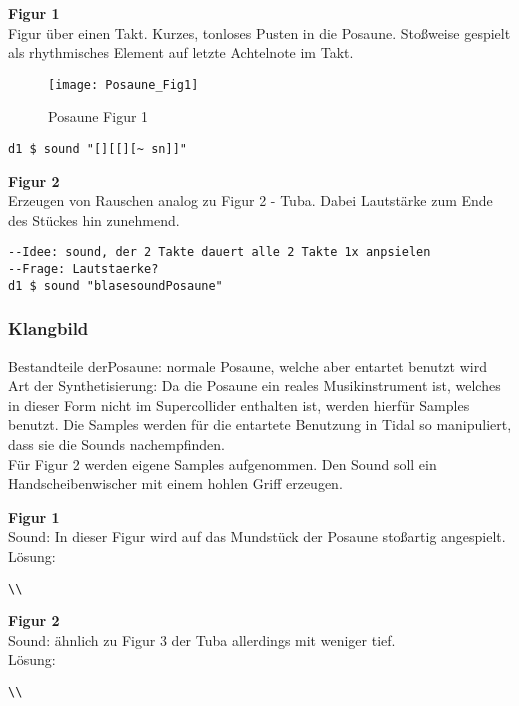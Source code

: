 \documentclass[
10pt, %
a4paper, %
oneside, %
headinclude,footinclude, %
BCOR5mm, %
]{scrartcl}
\begin{document}
\noindent\textbf{Figur 1}\\
Figur über einen Takt. Kurzes, tonloses Pusten in die Posaune. Stoßweise gespielt als rhythmisches Element auf letzte Achtelnote im Takt.\\
\begin{figure}[h]
	\centering 
	\texttt{[image: Posaune\_Fig1]} 
	\caption{Posaune Figur 1}
\end{figure}

\begin{lstlisting}
d1 $ sound "[][[][~ sn]]"
\end{lstlisting}


\noindent\textbf{Figur 2}\\
Erzeugen von Rauschen analog zu Figur 2 - Tuba. Dabei Lautstärke zum Ende des Stückes hin zunehmend.
\begin{lstlisting}
--Idee: sound, der 2 Takte dauert alle 2 Takte 1x anpsielen
--Frage: Lautstaerke?
d1 $ sound "blasesoundPosaune"
\end{lstlisting}

\subsubsection{Klangbild}
Bestandteile derPosaune: normale Posaune, welche aber entartet benutzt wird\\
Art der Synthetisierung: Da die Posaune ein reales Musikinstrument ist, welches in dieser Form nicht im Supercollider enthalten ist,
werden hierfür Samples benutzt. Die Samples werden für die entartete Benutzung in Tidal so manipuliert, dass sie die Sounds
nachempfinden.\\
Für Figur 2 werden eigene Samples aufgenommen. Den Sound soll ein Handscheibenwischer mit einem hohlen Griff erzeugen.

\noindent\textbf{Figur 1}\\
 Sound: In dieser Figur wird auf das Mundstück der Posaune stoßartig angespielt.\\
Lösung:\\
\begin{lstlisting}
\\
\end{lstlisting}

\noindent\textbf{Figur 2}\\
Sound: ähnlich zu Figur 3 der Tuba allerdings mit weniger tief.\\
Lösung:\\
\begin{lstlisting}
\\
\end{lstlisting}
\end{document}
